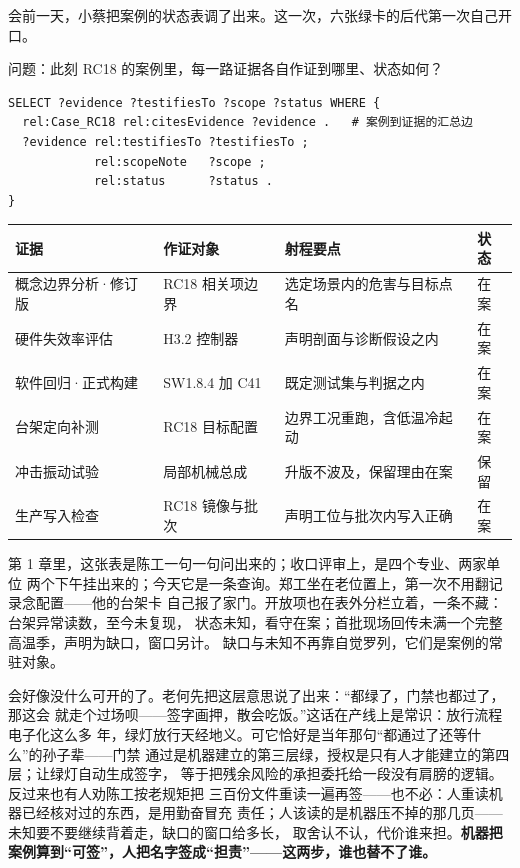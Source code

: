 会前一天，小蔡把案例的状态表调了出来。这一次，六张绿卡的后代第一次自己开口。

问题：此刻 RC18 的案例里，每一路证据各自作证到哪里、状态如何？

\nopagebreak[4]
\begin{codebox}
\begin{Verbatim}[fontsize=\small,breaklines=true,breakanywhere=true,breaksymbolleft={},breaksymbolright={}]
SELECT ?evidence ?testifiesTo ?scope ?status WHERE {
  rel:Case_RC18 rel:citesEvidence ?evidence .   # 案例到证据的汇总边
  ?evidence rel:testifiesTo ?testifiesTo ;
            rel:scopeNote   ?scope ;
            rel:status      ?status .
}
\end{Verbatim}
\end{codebox}

\begin{center}
\begingroup\small
\setlength{\tabcolsep}{4pt}
\begin{tabularx}{\linewidth}{@{}XXXX@{}}
\toprule
证据 & 作证对象 & 射程要点 & 状态 \\
\midrule
概念边界分析·修订版 & RC18 相关项边界 & 选定场景内的危害与目标点名 & 在案 \\
硬件失效率评估 & H3.2 控制器 & 声明剖面与诊断假设之内 & 在案 \\
软件回归·正式构建 & SW1.8.4 加 C41 & 既定测试集与判据之内 & 在案 \\
台架定向补测 & RC18 目标配置 & 边界工况重跑，含低温冷起动 & 在案 \\
冲击振动试验 & 局部机械总成 & 升版不波及，保留理由在案 & 保留 \\
生产写入检查 & RC18 镜像与批次 & 声明工位与批次内写入正确 & 在案 \\
\bottomrule
\end{tabularx}
\endgroup
\end{center}

第 1 章里，这张表是陈工一句一句问出来的；收口评审上，是四个专业、两家单位
两个下午挂出来的；今天它是一条查询。郑工坐在老位置上，第一次不用翻记录念配置——他的台架卡
自己报了家门。开放项也在表外分栏立着，一条不藏：台架异常读数，至今未复现，
状态未知，看守在案；首批现场回传未满一个完整高温季，声明为缺口，窗口另计。
缺口与未知不再靠自觉罗列，它们是案例的常驻对象。

会好像没什么可开的了。老何先把这层意思说了出来：“都绿了，门禁也都过了，那这会
就走个过场呗——签字画押，散会吃饭。”这话在产线上是常识：放行流程电子化这么多
年，绿灯放行天经地义。可它恰好是当年那句“都通过了还等什么”的孙子辈——门禁
通过是机器建立的第三层绿，授权是只有人才能建立的第四层；让绿灯自动生成签字，
等于把残余风险的承担委托给一段没有肩膀的逻辑。反过来也有人劝陈工按老规矩把
三百份文件重读一遍再签——也不必：人重读机器已经核对过的东西，是用勤奋冒充
责任；人该读的是机器压不掉的那几页——未知要不要继续背着走，缺口的窗口给多长，
取舍认不认，代价谁来担。\textbf{机器把案例算到“可签”，人把名字签成“担责”——这两步，谁也替不了谁。}

